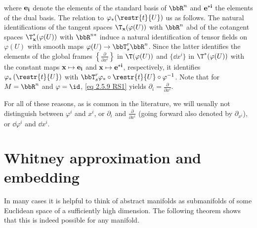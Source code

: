 \begin{rem}
\begin{enumerate}
        where $\bf e_i$ denote the elements of the standard basis of $\bbR^n$ and $\bf e^{\ast i}$ the elements of the dual basis. The relation to $\varphi_\ast(\restr{t}{U})$ us as follows. The natural identifications of the tangent spaces $\T_{\bf x}(\varphi(U))$ with $\bbR^n$ abd of the cotangent spaces $\T_{\bf x}^\ast(\varphi(U))$ with $\bbR^{n\ast }$ induce a natural identification of tensor fields on $\varphi(U)$ with smooth maps $\varphi(U)\to \bbT^r_s\bbR^n$. Since the latter identifies the elements of the global frames $\left\{\frac{\partial}{\partial x^i}\right\}$ in $\T (\varphi(U))$ and $\{\dd x^i\}$ in $\T^\ast(\varphi(U))$ with the constant maps $\bf x\mapsto \bf e_i$ and $\bf x\mapsto \bf e^{\ast i}$, respectively, it identifies $\varphi_{\ast}\left(\restr{t}{U}\right)$ with $\bbT^r_s\varphi_\ast\circ \restr{t}{U}\circ \varphi^{-1}$. Note that for $M=\bbR^n$ and $\varphi=\id$, \eqref{eq 2.5.9 RS1} yields $\partial_i=\frac{\partial}{\partial x^i}$. 
        
        For all of these reasons, as is common in the literature, we will usually not distinguish between $\varphi^i$ and $x^i$, or $\partial_i$ and $\frac{\partial}{\partial x^i}$ (going forward also denoted by $\partial_{x^i}$), or $\dd \varphi^i$ and $\dd x^i$.
    \end{enumerate}
\end{rem}





\section{Whitney approximation and embedding}

In many cases it is helpful to think of abstract manifolds as submanifolds of some Euclidean space of a sufficiently high dimension. The following theorem shows that this is indeed possible for any manifold.


